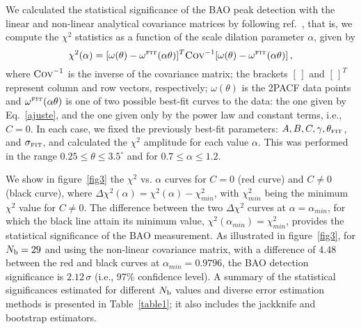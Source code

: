 \documentclass[a4paper,11pt]{article}
\begin{document}
We calculated the statistical significance of the BAO peak detection with the linear and non-linear 
analytical covariance matrices by following ref.~\cite{Shanks}, that is, we compute the $\chi^2$ 
statistics as a function of the scale dilation parameter $\alpha$, given by 
\begin{equation}\label{chi}
\chi^2(\alpha) = [\omega(\theta) - \omega^{\mbox{\tiny FIT}}(\alpha \theta)]^T \mbox{\sc Cov}^{-1} [\omega(\theta) - \omega^{\mbox{\tiny FIT}}(\alpha \theta)] \, ,
\end{equation}
%
where $\mbox{\sc Cov}^{-1}$ is the inverse of the covariance matrix; the brackets $[\,]$ and $[\,]^T$ 
represent column and row vectors, respectively; 
$\omega(\theta)$ is the 2PACF data points and $\omega^{\mbox{\tiny FIT}}(\alpha \theta)$ 
is one of two possible best-fit curves to the data: the one given by Eq.~\ref{ajuste}, and the one 
given only by the power law and constant terms, i.e., $C=0$. 
In each case, we fixed the previously best-fit parameters: 
$A, B, C, \gamma, \theta_{\mbox{\tiny FIT}}$, and $\sigma_{\mbox{\tiny FIT}}$, and calculated 
the $\chi^2$ amplitude for each value $\alpha$. 
This was performed in the range $0.25 \le \theta \le 3.5^{\circ}$ and for $0.7 \le \alpha \le 1.2$.

We show in figure~\ref{fig3} the $\chi^2$ vs. $\alpha$ curves for $C = 0$ (red curve) and $C \neq 0$ (black curve), where $\Delta\chi^2(\alpha) = \chi^2(\alpha) - \chi^2_{min}$, with $\chi^2_{min}$ being the minimum 
$\chi^2$ value for $C \neq 0$. 
The difference between the two $\Delta\chi^2$ curves at $\alpha = \alpha_{min}$, for which the black line attain its minimum value, $\chi^2(\alpha_{min}) = \chi^2_{min}$, provides the statistical significance of the BAO measurement.
As illustrated in figure~\ref{fig3}, for $N_{\mbox{\scriptsize b}} = 29$ and using the non-linear covariance matrix, with a difference of 4.48 between the red and black curves at $\alpha_{min} = 0.9796$, the BAO detection significance is  $2.12 \, \sigma$ (i.e., 97\% confidence level).
A summary of the statistical significances estimated for different $N_{\mbox{\scriptsize b}}$ values and diverse error estimation methods is presented in Table~\ref{table1}; it also includes the jackknife and bootstrap estimators. 
\end{document}
